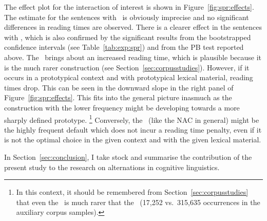 The effect plot for the interaction of interest is shown in Figure~\ref{fig:spr:effects}.
The estimate for the sentences with \NACa\ is obviously imprecise and no significant differences in reading times are observed.
There is a clearer effect in the sentences with \PGCa, which is also confirmed by the significant results from the bootstrapped confidence intervals (see Table~\ref{tab:exp:spr}) and from the PB test reported above.
The \PGCa\ brings about an increased reading time, which is plausible because it is the much rarer construction (see Section~\ref{sec:corpusstudies}).
However, if it occurs in a prototypical context and with prototypical lexical material, reading times drop.
This can be seen in the downward slope in the right panel of Figure~\ref{fig:spr:effects}.
This fits into the general picture inasmuch as the construction with the lower frequency might be developing towards a more sharply defined prototype.%
\footnote{In this context, it should be remembered from Section~\ref{sec:corpusstudies} that even the \PGCd\ is much rarer that the \NACb\ (17,252 vs.\ 315,635 occurrences in the auxiliary corpus samples).}
Conversely, the \NACa\ (like the NAC in general) might be the highly frequent default which does not incur a reading time penalty, even if it is not the optimal choice in the given context and with the given lexical material.

In Section~\ref{sec:conclusion}, I take stock and summarise the contribution of the present study to the research on alternations in cognitive linguistics.
